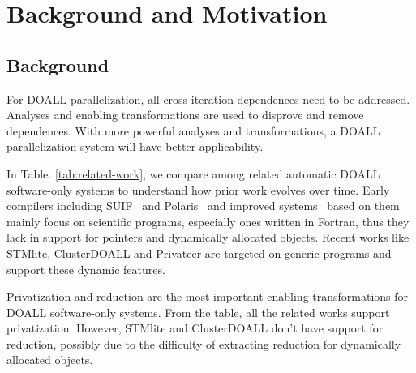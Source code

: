 \section{Background and Motivation}
\label{sec:motivation}

\subsection{Background}




For DOALL parallelization, all cross-iteration dependences need to be
addressed. Analyses and enabling transformations are used to disprove and
remove dependences. With more powerful analyses and transformations, a
DOALL parallelization system will have better applicability.

In Table. \ref{tab:related-work}, we compare among related automatic DOALL
software-only systems to understand how prior work evolves over time.
%
Early compilers including SUIF~\cite{blume:96:icpp} and
Polaris~\cite{suif:94:stanford} and improved
systems~\cite{Rus:07:ics,rus:03:hybrid,rauchwerger:99:pds} based on them
mainly focus on scientific programs, especially ones written in
Fortran, thus they lack in support for pointers and dynamically allocated
objects.
%
Recent works like STMlite\cite{mehrara:09:stmlite},
ClusterDOALL\cite{kim:12:cgo} and Privateer\cite{johnson:12:pldi} are
targeted on generic programs and support these dynamic features.

Privatization and reduction are the most important enabling transformations
for DOALL software-only systems. From the table, all the related works
support privatization. However, STMlite and ClusterDOALL don't have support
for reduction, possibly due to the difficulty of extracting reduction for
dynamically allocated objects.

